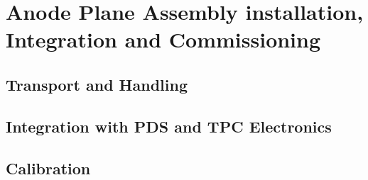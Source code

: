 \chapter{Anode Plane Assembly installation, Integration and Commissioning}
\label{ch:fdsp-apa-install}

\section{Transport and Handling}
\label{sec:fdsp-apa-install-transport}


\section{Integration with PDS and TPC Electronics}
\label{sec:fdsp-apa-install-pds-elec}


\section{Calibration}
\label{sec:fdsp-apa-install-calib}




